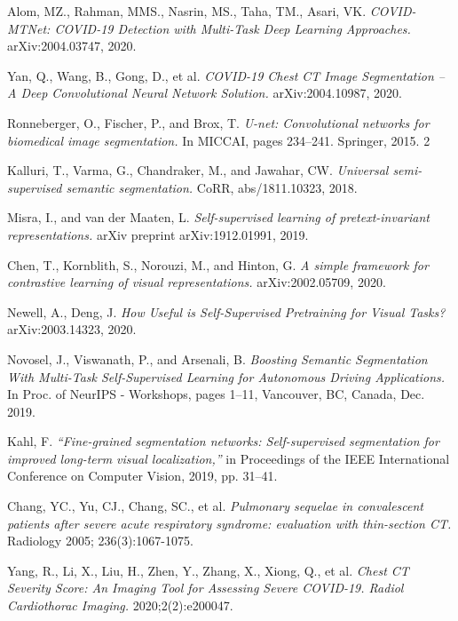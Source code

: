 \begin{thebibliography}{1}
	 Alom, MZ., Rahman, MMS., Nasrin, MS., Taha, TM., Asari, VK. \textit{COVID-MTNet: COVID-19 Detection with Multi-Task Deep Learning Approaches.} arXiv:2004.03747, 2020.
	
	 Yan, Q., Wang, B., Gong, D., et al. \textit{COVID-19 Chest CT Image Segmentation -- A Deep Convolutional Neural Network Solution.} arXiv:2004.10987, 2020.
	
	 Ronneberger, O., Fischer, P., and Brox, T. \textit{U-net: Convolutional networks for biomedical image segmentation.} In MICCAI, pages 234–241. Springer, 2015. 2
	
	 Kalluri, T., Varma, G., Chandraker, M., and Jawahar, CW. \textit{Universal semi-supervised semantic segmentation.} CoRR, abs/1811.10323, 2018.
	
	 Misra, I., and van der Maaten, L.\textit{ Self-supervised learning of pretext-invariant representations.} arXiv preprint arXiv:1912.01991, 2019.
	
	 Chen, T., Kornblith, S., Norouzi, M., and Hinton, G. \textit{A simple framework for contrastive learning of visual representations.} arXiv:2002.05709, 2020.
	
	 Newell, A., Deng, J. \textit{How Useful is Self-Supervised Pretraining for Visual Tasks?} arXiv:2003.14323, 2020.
	
	 Novosel, J., Viswanath, P., and Arsenali, B. \textit{Boosting Semantic Segmentation With Multi-Task Self-Supervised Learning for Autonomous Driving Applications.} In Proc. of NeurIPS - Workshops, pages 1–11, Vancouver, BC, Canada, Dec. 2019.
	
	 Kahl, F. \textit{“Fine-grained segmentation networks: Self-supervised segmentation for improved long-term visual localization,”} in Proceedings of the IEEE International Conference on Computer Vision, 2019, pp. 31–41.
	
	 Chang, YC., Yu, CJ., Chang, SC., et al. \textit{Pulmonary sequelae in convalescent patients after severe acute respiratory syndrome: evaluation with thin-section CT.} Radiology 2005; 236(3):1067-1075.
	
	 Yang, R., Li, X., Liu, H., Zhen, Y., Zhang, X., Xiong, Q., et al. \textit{Chest CT Severity Score: An Imaging Tool for Assessing Severe COVID-19. Radiol Cardiothorac Imaging.} 2020;2(2):e200047.
	

\end{thebibliography}
